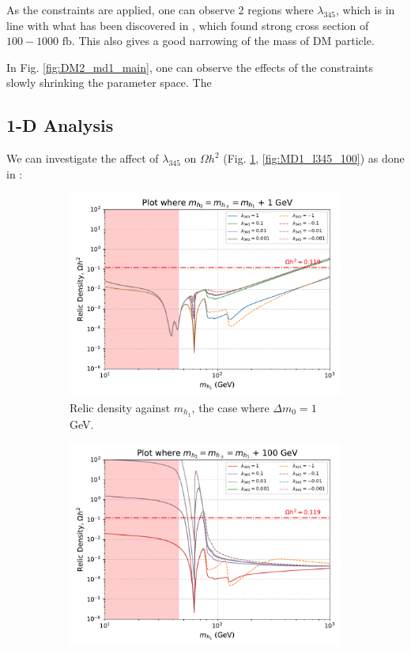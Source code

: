 \documentclass[12pt]{article}
\begin{document}
As the constraints are applied, one can observe 2 regions where $\lambda_{345}$, which is in line with what has been discovered in \cite{Belyaev:2018ext}, which found strong cross section of $100 - 1000 \text{ fb}$. This also gives a good narrowing of the mass of DM particle.

In Fig. \ref{fig:DM2_md1_main}, one can observe the effects of the constraints slowly shrinking the parameter space. The

\subsection{1-D Analysis}
\label{1-D scan}
We can investigate the affect of $\lambda_{345}$ on $\Omega h^2$ (Fig. \ref{fig:MD1_l345_1}, \ref{fig:MD1_l345_100}) as done in \cite{Belyaev:2016lok}:
\begin{figure}[H]
    \centering
    \begin{subfigure}[b]{0.49\textwidth}
        \centering
        \includegraphics[width=\textwidth]{plots/plot_MD1_l345+1.pdf}
        \caption{Relic density against $m_{h_1}$, the case where $\Delta m_0 = 1$ GeV.}
        \label{fig:MD1_l345_1}
    \end{subfigure}
    \hfill
    \begin{subfigure}[b]{0.49\textwidth}
        \centering
        \includegraphics[width=\textwidth]{plots/plot_MD1_l345+100.pdf}

\end{subfigure}
\end{figure}
\end{document}
